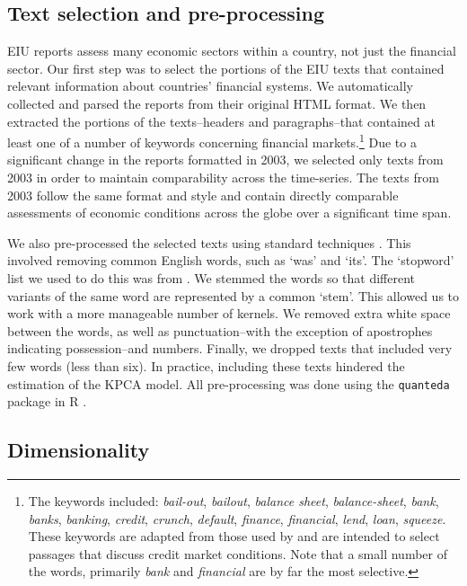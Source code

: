 \documentclass[]{article}
\begin{document}
\subsection*{Text selection and pre-processing}\label{text-selection}

EIU reports assess many economic sectors within a country,
not just the financial sector.
Our first step was to select the portions of the EIU texts that contained relevant information about countries' financial systems. We automatically collected and parsed the reports from their original HTML format. We then extracted the portions of the texts--headers and paragraphs--that contained at least one of a number of keywords concerning financial markets.\footnote{The
  keywords included: \emph{bail-out}, \emph{bailout}, \emph{balance
  sheet}, \emph{balance-sheet}, \emph{bank}, \emph{banks},
  \emph{banking}, \emph{credit}, \emph{crunch}, \emph{default},
  \emph{finance}, \emph{financial}, \emph{lend}, \emph{loan},
  \emph{squeeze}. These keywords are adapted
  from those used by \cite{Romer2015} and are intended to
  select passages that discuss credit market conditions. Note that a small number of the words, primarily \emph{bank} and \emph{financial} are by far the most selective.} Due to a significant change in the reports formatted in 2003, we selected only texts from 2003 in order to maintain comparability across the time-series. The texts from 2003 follow the same format and style and contain directly comparable assessments of economic conditions across the globe over a significant time span.

We also pre-processed the selected texts using standard techniques \citep[see][]{Grimmer2013}. This involved removing common English words, such as `was' and `its'. The `stopword' list we used to do this was from \cite{dhillon:modha:mlj01}. We stemmed the words so that different variants of the same word are represented by a common `stem'. This allowed us to work with a more manageable number of kernels. We removed extra white space between the words, as well as punctuation--with the exception of apostrophes indicating possession--and numbers. Finally, we dropped texts that included very few words (less than six). In practice, including these texts hindered the estimation of the KPCA model. All pre-processing was done using the \texttt{quanteda} package \citep{quantedaCite} in R \citep{R-cite}.

\subsection*{Dimensionality}\label{dimensionality}
\end{document}
